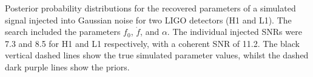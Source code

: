 \label{fig:ffdot_inj2}
Posterior probability distributions for the recovered parameters of a simulated signal injected into Gaussian
noise for two LIGO detectors (H1 and L1). The search included the parameters $f_0$, $\dot{f}$, and $\alpha$. The
individual injected SNRs were 7.3 and 8.5 for H1 and L1 respectively, with a coherent SNR of 11.2. The black
vertical dashed lines show the true simulated parameter values, whilst the dashed dark purple lines show the
priors.
